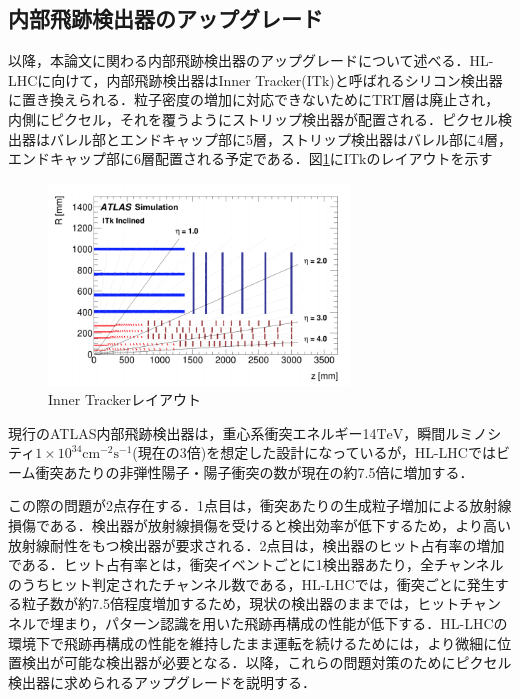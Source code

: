 \subsection{内部飛跡検出器のアップグレード}
以降，本論文に関わる内部飛跡検出器のアップグレードについて述べる．HL-LHCに向けて，内部飛跡検出器はInner Tracker(ITk)と呼ばれるシリコン検出器に置き換えられる．粒子密度の増加に対応できないためにTRT層は廃止され，内側にピクセル，それを覆うようにストリップ検出器が配置される．ピクセル検出器はバレル部とエンドキャップ部に5層，ストリップ検出器はバレル部に4層，エンドキャップ部に6層配置される予定である．図\ref{fig:ITkview}にITkのレイアウトを示す\par

\begin{figure}[h]
  \centering
  \includegraphics[width=8cm]{./figure/ITkview.png}
  \caption{Inner Trackerレイアウト\cite{Collaboration:2285585}}
  \label{fig:ITkview}
\end{figure}


現行のATLAS内部飛跡検出器は，重心系衝突エネルギー14$\mathrm{TeV}$，瞬間ルミノシティ$1 \times 10^34 \mathrm{cm^{-2} s^{-1}}$(現在の3倍)を想定した設計になっているが，HL-LHCではビーム衝突あたりの非弾性陽子・陽子衝突の数が現在の約7.5倍に増加する．\par
この際の問題が2点存在する．1点目は，衝突あたりの生成粒子増加による放射線損傷である．検出器が放射線損傷を受けると検出効率が低下するため，より高い放射線耐性をもつ検出器が要求される．2点目は，検出器のヒット占有率の増加である．ヒット占有率とは，衝突イベントごとに1検出器あたり，全チャンネルのうちヒット判定されたチャンネル数である，HL-LHCでは，衝突ごとに発生する粒子数が約7.5倍程度増加するため，現状の検出器のままでは，ヒットチャンネルで埋まり，パターン認識を用いた飛跡再構成の性能が低下する．HL-LHCの環境下で飛跡再構成の性能を維持したまま運転を続けるためには，より微細に位置検出が可能な検出器が必要となる．以降，これらの問題対策のためにピクセル検出器に求められるアップグレードを説明する．\par

